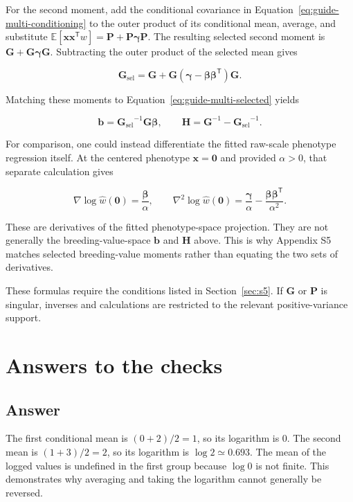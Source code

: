 \documentclass[11pt]{article}
\newcommand{\vect}[1]{\boldsymbol{#1}}
\newcommand{\mat}[1]{\mathbf{#1}}
\newcommand{\bgamma}{\boldsymbol{\gamma}}
\newcommand{\E}{\mathbb{E}}
\newcommand{\Gsel}{\ensuremath{\mat G_{\mathrm{sel}}}}
\newcounter{answer}
\newcommand{\answerheading}[1]{%
  \refstepcounter{answer}%
  \subsection*{Answer \theanswer}%
  \label{ans:#1}%
}
\begin{document}
For the second moment, add the conditional covariance in
Equation~\eqref{eq:guide-multi-conditioning} to the outer product of its
conditional mean, average, and substitute
$\E[\vect x\vect x^{\mathsf T}w]
=\mat P+\mat P\bgamma\mat P$.  The resulting selected second moment is
$\mat G+\mat G\bgamma\mat G$.  Subtracting the outer product of the selected
mean gives

\begin{equation}
\Gsel=\mat G+
\mat G(\bgamma-\vect\beta\vect\beta^{\mathsf T})\mat G.
\end{equation}

Matching these moments to Equation~\eqref{eq:guide-multi-selected} yields

\begin{equation}
\vect b=\Gsel^{-1}\mat G\vect\beta,
\qquad
\mat H=\mat G^{-1}-\Gsel^{-1}.
\end{equation}

For comparison, one could instead differentiate the fitted raw-scale
phenotype regression itself.  At the centered phenotype $\vect x=\vect0$ and
provided $\alpha>0$, that separate calculation gives

\begin{equation}
\nabla\log\widehat w(\vect0)=\frac{\vect\beta}{\alpha},
\qquad
\nabla^2\log\widehat w(\vect0)
=\frac{\bgamma}{\alpha}
-\frac{\vect\beta\vect\beta^{\mathsf T}}{\alpha^2}.
\label{eq:guide-multi-raw-derivatives}
\end{equation}

These are derivatives of the fitted phenotype-space projection.  They are not
generally the breeding-value-space $\vect b$ and $\mat H$ above.  This is why
Appendix S5 matches selected breeding-value moments rather than equating the
two sets of derivatives.

These formulas require the conditions listed in Section~\ref{sec:s5}.  If
$\mat G$ or $\mat P$ is singular, inverses and calculations are restricted to
the relevant positive-variance support.

\section{Answers to the checks}

\answerheading{1}
The first conditional mean is $(0+2)/2=1$, so its logarithm is 0.  The second
mean is $(1+3)/2=2$, so its logarithm is $\log 2\simeq0.693$.  The mean of the
logged values is undefined in the first group because $\log 0$ is not finite.
This demonstrates why averaging and taking the logarithm cannot generally be
reversed.
\end{document}
